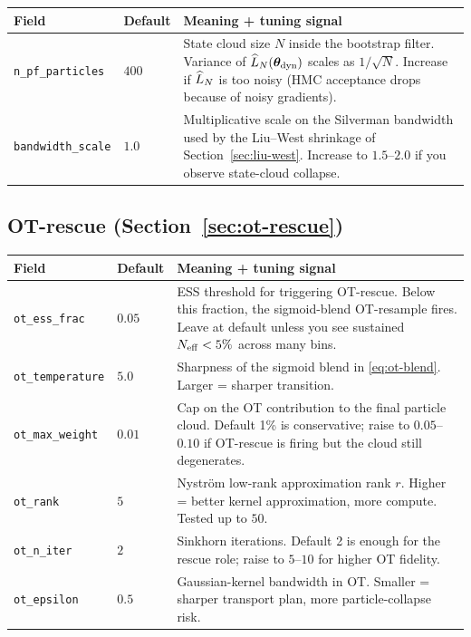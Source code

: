 \begin{center}\small
\begin{longtable}{lp{3cm}p{8cm}}
\toprule
Field & Default & Meaning + tuning signal \\
\midrule
\endhead
\texttt{n\_pf\_particles}     & $400$  & State cloud size $N$ inside the bootstrap filter. Variance of $\widehat{L}_N(\bm{\theta}_{\rm dyn})$ scales as $1/\sqrt{N}$. Increase if $\widehat{L}_N$ is too noisy (HMC acceptance drops because of noisy gradients). \\
\texttt{bandwidth\_scale}      & $1.0$  & Multiplicative scale on the Silverman bandwidth used by the Liu--West shrinkage of Section~\ref{sec:liu-west}. Increase to $1.5$--$2.0$ if you observe state-cloud collapse. \\
\bottomrule
\end{longtable}
\end{center}

\subsection{OT-rescue (Section~\ref{sec:ot-rescue})}

\begin{center}\small
\begin{longtable}{lp{3cm}p{8cm}}
\toprule
Field & Default & Meaning + tuning signal \\
\midrule
\endhead
\texttt{ot\_ess\_frac}        & $0.05$ & ESS threshold for triggering OT-rescue. Below this fraction, the sigmoid-blend OT-resample fires. Leave at default unless you see sustained $N_{\rm eff} < 5\%$ across many bins. \\
\texttt{ot\_temperature}      & $5.0$  & Sharpness of the sigmoid blend in \eqref{eq:ot-blend}. Larger = sharper transition. \\
\texttt{ot\_max\_weight}      & $0.01$ & Cap on the OT contribution to the final particle cloud. Default 1\% is conservative; raise to $0.05$--$0.10$ if OT-rescue is firing but the cloud still degenerates. \\
\texttt{ot\_rank}             & $5$    & Nystr\"om low-rank approximation rank $r$. Higher = better kernel approximation, more compute. Tested up to $50$. \\
\texttt{ot\_n\_iter}          & $2$    & Sinkhorn iterations. Default 2 is enough for the rescue role; raise to $5$--$10$ for higher OT fidelity. \\
\texttt{ot\_epsilon}          & $0.5$  & Gaussian-kernel bandwidth in OT. Smaller = sharper transport plan, more particle-collapse risk. \\
\bottomrule
\end{longtable}
\end{center}

